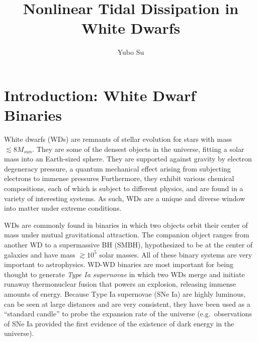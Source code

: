 \documentclass[11pt,
        usenames, %
        dvipsnames %
    ]{article}
\begin{document}
\def\Snospace~{\S{}} %
\renewcommand*{\sectionautorefname}{\Snospace}
\renewcommand*{\subsectionautorefname}{\Snospace}
\renewcommand*{\appendixautorefname}{\Snospace}
\renewcommand*{\figureautorefname}{Fig.}
\renewcommand*{\equationautorefname}{Eq.}
\renewcommand*{\tableautorefname}{Tab.}



\title{Nonlinear Tidal Dissipation in White Dwarfs}
\author{Yubo Su}
\date{}

\maketitle

\section{Introduction: White Dwarf Binaries}

White dwarfs (WDs) are remnants of stellar evolution for stars with mass
$\lesssim 8 M_{sun}$. They are some of the densest objects in the universe,
fitting a solar mass into an Earth-sized sphere. They are supported against
gravity by electron degeneracy pressure, a quantum mechanical effect arising from
subjecting electrons to immense pressures Furthermore, they exhibit various
chemical compositions, each of which is subject to different physics, and are
found in a variety of interesting systems. As such, WDs are a unique and diverse
window into matter under extreme conditions.

WDs are commonly found in binaries in which two objects orbit their center of
mass under mutual gravitational attraction. The companion object ranges
from another WD to a supermassive BH (SMBH), hypothesized to be at the center of
galaxies and have mass $\gtrsim 10^5$ solar masses. All of these binary systems
are very important to astrophysics. WD-WD binaries are most important for being
thought to generate \emph{Type Ia supernovae} in which two WDs merge and
initiate runaway thermonuclear fusion that powers an explosion, releasing
immense amounts of energy. Because Type Ia supernovae (SNe Ia) are highly
luminous, can be seen at large distances and are very consistent, they have been
used as a ``standard candle'' to probe the expansion rate of the universe (e.g.\
observations of SNe Ia provided the first evidence of the existence of dark
energy in the universe).
\end{document}
